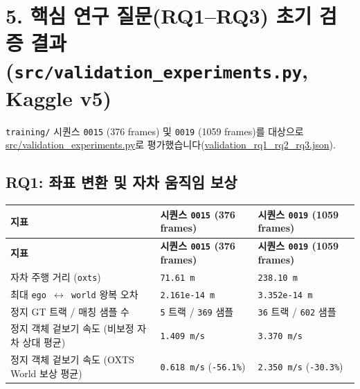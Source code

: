 \documentclass[10.5pt,a4paper]{article}
\begin{document}
\section{5. 핵심 연구 질문(RQ1--RQ3) 초기 검증 결과 (\texttt{src/\allowbreak{}validation\_\allowbreak{}experiments.\allowbreak{}py}, Kaggle v5)}

\texttt{training/\allowbreak{}} 시퀀스 \texttt{0015} (376 frames) 및 \texttt{0019} (1059 frames)를 대상으로 \href{https://github.com/Heisnotanimposter/Totalcare\_autonomous\_driving\_Yolov5/blob/main/src/validation\_experiments.py}{src/validation\_experiments.py}로 평가했습니다(\href{https://github.com/Heisnotanimposter/Totalcare\_autonomous\_driving\_Yolov5/blob/main/results/world\_model/world\_outputs/validation\_rq1\_rq2\_rq3.json}{validation\_rq1\_rq2\_rq3.json}).


\subsection{RQ1: 좌표 변환 및 자차 움직임 보상}

\begin{footnotesize}
\setlength{\tabcolsep}{4pt}
\setlength{\LTleft}{0pt}\setlength{\LTright}{0pt}
\begin{longtable}{>{\raggedright\arraybackslash}p{} >{\raggedright\arraybackslash}p{} >{\raggedright\arraybackslash}p{}}
\toprule
\textbf{지표} & \textbf{시퀀스 \texttt{0015} (376 frames)} & \textbf{시퀀스 \texttt{0019} (1059 frames)} \\
\midrule
\endfirsthead
\toprule
\textbf{지표} & \textbf{시퀀스 \texttt{0015} (376 frames)} & \textbf{시퀀스 \texttt{0019} (1059 frames)} \\
\midrule
\endhead
\bottomrule
\endfoot
자차 주행 거리 (\texttt{oxts}) & \texttt{71.\allowbreak{}61 m} & \texttt{238.\allowbreak{}10 m} \\
최대 \texttt{ego $\leftrightarrow$ world} 왕복 오차 & \texttt{2.\allowbreak{}161e-\allowbreak{}14 m} & \texttt{3.\allowbreak{}352e-\allowbreak{}14 m} \\
정지 GT 트랙 / 매칭 샘플 수 & \texttt{5} 트랙 / \texttt{369} 샘플 & \texttt{36} 트랙 / \texttt{602} 샘플 \\
정지 객체 겉보기 속도 (비보정 자차 상대 평균) & \texttt{1.\allowbreak{}409 m/\allowbreak{}s} & \texttt{3.\allowbreak{}370 m/\allowbreak{}s} \\
정지 객체 겉보기 속도 (OXTS World 보상 평균) & \texttt{0.\allowbreak{}618 m/\allowbreak{}s} (\texttt{-\allowbreak{}56.\allowbreak{}1\%}) & \texttt{2.\allowbreak{}350 m/\allowbreak{}s} (\texttt{-\allowbreak{}30.\allowbreak{}3\%}) \\
\end{longtable}
\end{footnotesize}
\end{document}
